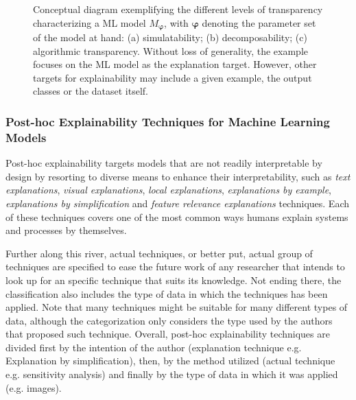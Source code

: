 \documentclass[final]{elsarticle}
\begin{document}
\begin{figure}[ht]
        \caption{Conceptual diagram exemplifying the different levels of transparency characterizing a ML model $M_{\bm{\varphi}}$, with $\bm{\varphi}$ denoting the parameter set of the model at hand: (a) simulatability; (b) decomposability; (c) algorithmic transparency. {\color{black}Without loss of generality, the example focuses on the ML model as the explanation target. However, other targets for explainability may include a given example, the output classes or the dataset itself.}}
        \label{fig:transparentML}
      \end{figure}

\subsubsection{Post-hoc Explainability Techniques for Machine Learning Models}

Post-hoc explainability targets models that are not readily interpretable by design by resorting to diverse means to enhance their interpretability, such as \textit{text explanations}, \textit{visual explanations}, \textit{local explanations}, \textit{explanations by example}, \textit{explanations by simplification} and \textit{feature relevance explanations} techniques. Each of these techniques covers one of the most common ways humans explain systems and processes by themselves.  

Further along this river, actual techniques, or better put, actual group of techniques are specified to ease the future work of any researcher that intends to look up for an specific technique that suits its knowledge. Not ending there, the classification also includes the type of data in which the techniques has been applied. Note that many techniques might be suitable for many different types of data, although the categorization only considers the type used by the authors that proposed such technique. Overall, post-hoc explainability techniques are divided first by the intention of the author (explanation technique e.g. Explanation by simplification), then, by the method utilized (actual technique e.g. sensitivity analysis) and finally by the type of data in which it was applied (e.g. images).
\end{document}
